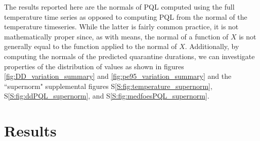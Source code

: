 \documentclass[10pt,a4paper,twocolumn]{article}
\begin{document}
The results reported here are the normals of PQL computed using the full temperature time series
as opposed to computing PQL from the normal of the temperature timeseries.
While the latter is fairly common practice, it is not mathematically proper 
since, as with means, the normal of a function of $X$ is not generally equal to the function applied to the normal of $X$.
Additionally, by computing the normals of the predicted quarantine durations, 
we can investigate properties of the distribution of values as shown in 
figures \ref{fig:DD_variation_summary} and \ref{fig:pe95_variation_summary} 
and the ``supernorm" supplemental figures 
S\ref{S:fig:temperature_supernorm}, 
S\ref{S:fig:ddPQL_supernorm},
and S\ref{S:fig:medfoesPQL_supernorm}.

%
%

\section*{Results}
\end{document}
